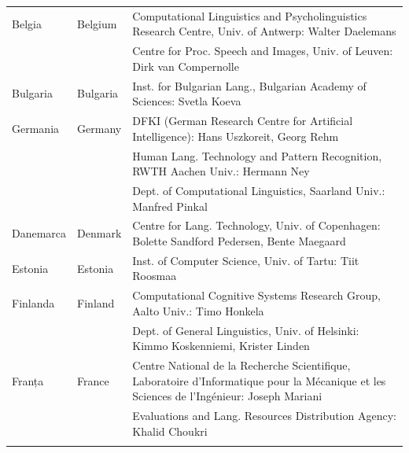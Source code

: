 \documentclass[]{../../metanetpaper}
\begin{document}
\cleardoublepage

\appendix
{}



  
\cleardoublepage

\label{metanetmembers}

\small
\begin{longtable}{llp{105mm}}
  Belgia & \textcolor{grey1}{Belgium} & Computational Linguistics and Psycholinguistics Research Centre, Univ. of Antwerp: Walter Daelemans\\ \addlinespace
  & & Centre for Proc. Speech and Images, Univ. of Leuven: Dirk van Compernolle \\ \addlinespace
  Bulgaria & \textcolor{grey1}{Bulgaria} & Inst. for Bulgarian Lang., Bulgarian Academy of Sciences: Svetla Koeva \\ \addlinespace
  Germania & \textcolor{grey1}{Germany} & DFKI (German Research Centre for Artificial Intelligence): Hans Uszkoreit, Georg Rehm\\ \addlinespace
  & & Human Lang. Technology and Pattern Recognition, RWTH Aachen Univ.: Hermann Ney \\ \addlinespace
  & & Dept. of Computational Linguistics, Saarland Univ.: Manfred Pinkal\\ \addlinespace Danemarca &  \textcolor{grey1}{Denmark} & Centre for Lang. Technology, Univ. of Copenhagen: Bolette Sandford Pedersen, Bente Maegaard\\ \addlinespace
  Estonia & \textcolor{grey1}{Estonia} & Inst. of Computer Science, Univ. of Tartu: Tiit Roosmaa\\ \addlinespace
  Finlanda & \textcolor{grey1}{Finland} & Computational Cognitive Systems Research Group, Aalto Univ.: Timo Honkela\\ \addlinespace
  & & Dept. of General Linguistics, Univ. of Helsinki: Kimmo Koskenniemi, Krister Linden \\ \addlinespace
  Franța & \textcolor{grey1}{France} & Centre National de la Recherche Scientifique, Laboratoire d'Informatique pour la Mécanique et les Sciences de l'Ingénieur: Joseph Mariani \\ \addlinespace
  & & Evaluations and Lang. Resources Distribution Agency: Khalid Choukri\\ \addlinespace 

\end{longtable}
\end{document}
